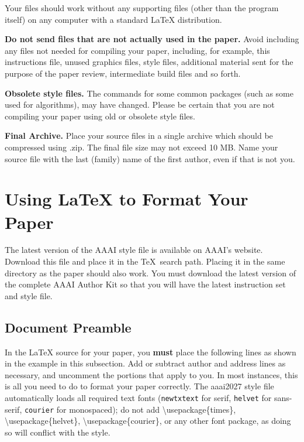 \documentclass[letterpaper]{article} %
\begin{document}
Your files should work without any supporting files (other than the program itself) on any computer with a standard \LaTeX{} distribution.

\textbf{Do not send files that are not actually used in the paper.} Avoid including any files not needed for compiling your paper, including, for example, this instructions file, unused graphics files, style files, additional material sent for the purpose of the paper review, intermediate build files and so forth.

\textbf{Obsolete style files.} The commands for some common packages (such as some used for algorithms), may have changed. Please be certain that you are not compiling your paper using old or obsolete style files.

\textbf{Final Archive.} Place your source files in a single archive which should be compressed using .zip. The final file size may not exceed 10 MB.
Name your source file with the last (family) name of the first author, even if that is not you.


\section{Using \LaTeX{} to Format Your Paper}

The latest version of the AAAI style file is available on AAAI's website. Download this file and place it in the \TeX\ search path. Placing it in the same directory as the paper should also work. You must download the latest version of the complete AAAI Author Kit so that you will have the latest instruction set and style file.

\subsection{Document Preamble}

In the \LaTeX{} source for your paper, you \textbf{must} place the following lines as shown in the example in this subsection. Add or subtract author and address lines as necessary, and uncomment the portions that apply to you. In most instances, this is all you need to do to format your paper correctly. The aaai2027 style file automatically loads all required text fonts (\texttt{newtxtext} for serif, \texttt{helvet} for sans-serif, \texttt{courier} for monospaced); do not add \textbackslash usepackage\{times\}, \textbackslash usepackage\{helvet\}, \textbackslash usepackage\{courier\}, or any other font package, as doing so will conflict with the style.
\end{document}
